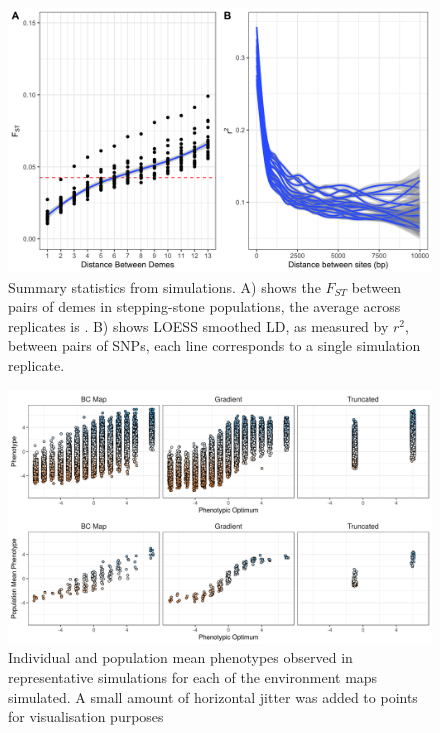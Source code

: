 \documentclass[11pt,twoside,lineno]{GSA_format}
\begin{document}
\begin{figure}[H]
  \includegraphics[width=\textwidth,height=0.75\textheight,keepaspectratio]{../SimulationStudy/directionalSelection/SummaryStats.png}
  \caption{Summary statistics from simulations. A) shows the $F_{ST}$ between pairs of demes in stepping-stone populations, the average across replicates is . B) shows LOESS smoothed LD, as measured by $r^2$, between pairs of SNPs, each line corresponds to a single simulation replicate.}

  \label{fig:summaryStats}
\end{figure}

\pagebreak

\begin{figure}[H]
  \includegraphics[width=\textwidth,height=0.75\textheight,keepaspectratio]{Plots/PhenotypePlot.png}
  \caption{Individual and population mean phenotypes observed in representative simulations for each of the environment maps simulated. A small amount of horizontal jitter was added to points for visualisation purposes}

  \label{fig:localAdaptationPhenotypes}
\end{figure}
\end{document}
